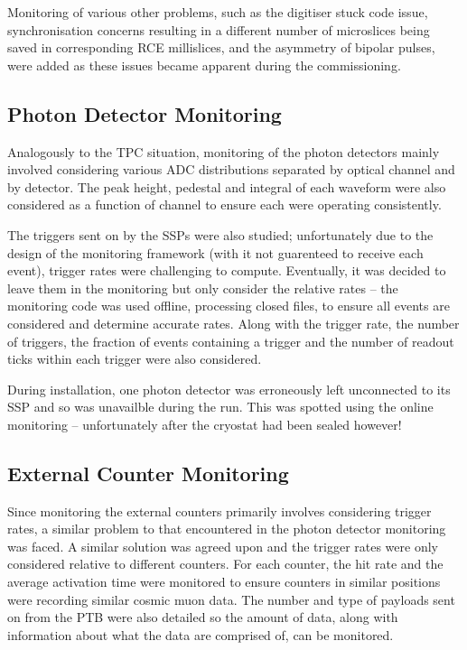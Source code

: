Monitoring of various other problems, such as the digitiser stuck code issue, synchronisation concerns resulting in a different number of microslices being saved in corresponding RCE millislices, and the asymmetry of bipolar pulses, were added as these issues became apparent during the commissioning.

\subsection{Photon Detector Monitoring}\label{sec:PhotonMonitoring}

Analogously to the TPC situation, monitoring of the photon detectors mainly involved considering various ADC distributions separated by optical channel and by detector.  The peak height, pedestal and integral of each waveform were also considered as a function of channel to ensure each were operating consistently.

The triggers sent on by the SSPs were also studied; unfortunately due to the design of the monitoring framework (with it not guarenteed to receive each event), trigger rates were challenging to compute.  Eventually, it was decided to leave them in the monitoring but only consider the relative rates -- the monitoring code was used offline, processing closed files, to ensure all events are considered and determine accurate rates.  Along with the trigger rate, the number of triggers, the fraction of events containing a trigger and the number of readout ticks within each trigger were also considered.

During installation, one photon detector was erroneously left unconnected to its SSP and so was unavailble during the run.  This was spotted using the online monitoring -- unfortunately after the cryostat had been sealed however!

\subsection{External Counter Monitoring}\label{sec:CounterMonitoring}

Since monitoring the external counters primarily involves considering trigger rates, a similar problem to that encountered in the photon detector monitoring was faced.  A similar solution was agreed upon and the trigger rates were only considered relative to different counters.  For each counter, the hit rate and the average activation time were monitored to ensure counters in similar positions were recording similar cosmic muon data.  The number and type of payloads sent on from the PTB were also detailed so the amount of data, along with information about what the data are comprised of, can be monitored.

